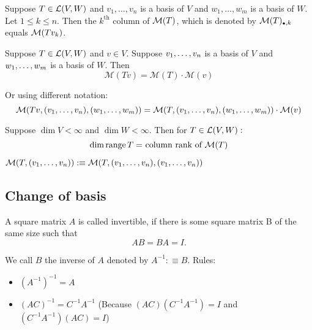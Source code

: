   \setcounter{thm}{74}
  \begin{thm} [$\mmatrix(T)_{\mathsmaller{\bullet}, k} = \mmatrix(T v_k)$]
    Suppose $T \in \mathcal{L}(V,W)$ and $v_1, \ldots, v_n$ is a basis of $V$ and $w_1, \ldots, w_m$ is a basis of $W$. Let $1\leq k \leq n$. Then the $k^{\text{th}}$ column of $\mathcal{M}(T)$, which is denoted by $\mmatrix(T)_{\mathsmaller{\bullet}, k}$ equals $\mathcal{M}(Tv_k)$.
  \end{thm}

  \begin{thm} 
    Suppose $T\in {\mathcal{L}(V,W)}$ and $v\in V$. Suppose $v_1, \dots, v_n$ is a basis of $V$ and $w_1, \dots, w_m$ is a basis of $W$. Then
    \begin{equation}
      \mathcal{M} (Tv)=\mathcal{M}(T) \cdot \mathcal{M}(v)
    \end{equation}

    Or using different notation:
    \begin{equation}
      \mathcal{M} (Tv, (v_1, \dots, v_n), (w_1, \dots, w_m))=\mathcal{M}(T, (v_1, \dots, v_n), (w_1, \dots, w_m)) \cdot \mathcal{M}(v)
    \end{equation}

  \end{thm}

  \setcounter{thm}{77}
  \begin{thm} 
    Suppose $\dim V < \infty$ and $\dim W < \infty$. Then for $T \in \mathcal{L}(V,W):$ 
    \begin{equation}
      \dim \myrange T = $ column rank of $ \mmatrix (T)
    \end{equation}
  \begin{mydef-non}
  $\mathcal{M}(T, (v_1, \dots, v_n)) :\equiv \mathcal{M}(T, (v_1, \dots, v_n),(v_1, \dots, v_n))$
\end{mydef-non}
  \end{thm}

  \subsection{Change of basis}


  \setcounter{thm}{79}
  \begin{mydef}
    A square matrix $A$ is called invertible, if there is some square matrix B of the same size such that 
    \begin{equation}
    	AB=BA=I.
    \end{equation} 
    
    We call $B$ the inverse of $A$ denoted by $A^{-1} :\equiv B$. Rules:
    \begin{itemize}
      \item $(A^{-1})^{-1}=A$
      \item $(AC)^{-1} = C^{-1}A^{-1}$ (Because $(AC)(C^{-1}A^{-1})=I$ and $(C^{-1}A^{-1})(AC)=I$)
    \end{itemize}
  \end{mydef}

